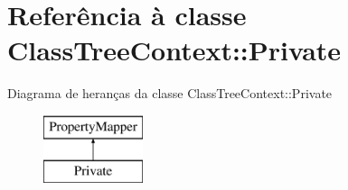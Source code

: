 \hypertarget{class_class_tree_context_1_1_private}{\section{Referência à classe Class\-Tree\-Context\-:\-:Private}
\label{class_class_tree_context_1_1_private}
}
Diagrama de heranças da classe Class\-Tree\-Context\-:\-:Private\begin{figure}[H]
\begin{center}
\leavevmode
\includegraphics[height=2.000000cm]{class_class_tree_context_1_1_private}
\end{center}
\end{figure}
